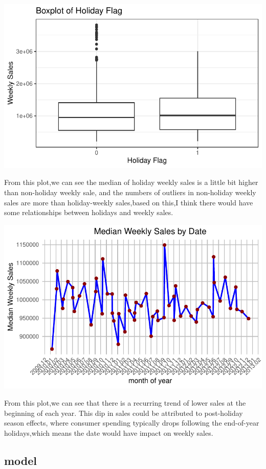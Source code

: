 \documentclass[
  letterpaper,
  DIV=11,
  numbers=noendperiod]{scrartcl}
\begin{document}
\includegraphics{678final_files/figure-pdf/unnamed-chunk-6-1.pdf}

From this plot,we can see the median of holiday weekly sales is a little
bit higher than non-holiday weekly sale, and the numbers of outliers in
non-holiday weekly sales are more than holiday-weekly sales,based on
this,I think there would have some relationships between holidays and
weekly sales.

\includegraphics{678final_files/figure-pdf/unnamed-chunk-7-1.pdf}

From this plot,we can see that there is a recurring trend of lower sales
at the beginning of each year. This dip in sales could be attributed to
post-holiday season effects, where consumer spending typically drops
following the end-of-year holidays,which means the date would have
impact on weekly sales.

\hypertarget{model}{%
\subsection{model}\label{model}}
\end{document}
